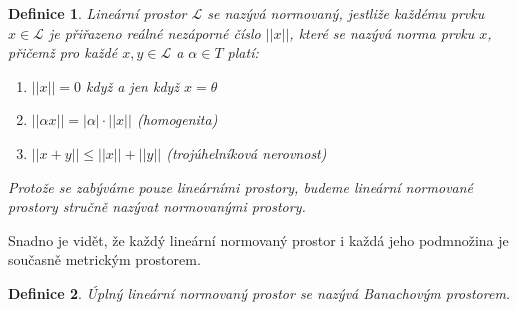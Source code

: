 \documentclass[a4paper, 11pt]{report}
\newtheorem{mydef}{Definice}[chapter]
\begin{document}
\begin{mydef}
Lineární prostor $\mathcal{L}$ se nazývá \emph{normovaný}, jestliže každému prvku $x \in \mathcal{L}$ je přiřazeno reálné nezáporné číslo $||x||$, které se nazývá \emph{norma} prvku $x$, přičemž pro každé $x, y \in \mathcal{L}$ a $ \alpha \in T$ platí:
\begin{enumerate}
	\item $||x|| = 0$ když a jen když $x = \theta$
	\item $||\alpha x|| = |\alpha| \cdot ||x||$ (homogenita)
	\item $||x + y|| \leq ||x|| + ||y||$ (trojúhelníková nerovnost)
\end{enumerate}
Protože se zabýváme pouze lineárními prostory, budeme lineární normované prostory stručně nazývat \emph{normovanými prostory}.
\end{mydef}

Snadno je vidět, že každý lineární normovaný prostor i každá jeho podmnožina je současně metrickým prostorem.

\begin{mydef}
\emph{Úplný} lineární normovaný prostor se nazývá \emph{Banachovým prostorem}.
\end{mydef}
\end{document}
